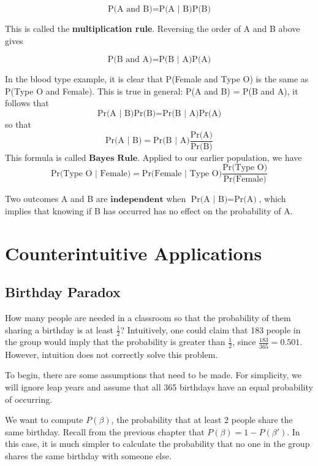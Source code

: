 \documentclass[
]{book}
\begin{document}
\[
\mbox{P(A and B)} = \mbox{P(A | B)}\mbox{P(B)}  
\]

This is called the \textbf{multiplication rule}. Reversing the order of A and B above gives

\[
\mbox{P(B and A)} = \mbox{P(B | A)}\mbox{P(A)}  
\]

In the blood type example, it is clear that P(Female and Type O) is the same as P(Type O and Female).
This is true in general: P(A and B) = P(B and A), it follows that
\[
\mbox{Pr(A | B)}\mbox{Pr(B)}  = \mbox{Pr(B | A)}\mbox{Pr(A)} 
\]
so that
\[
\mbox{Pr(A | B)}  = \mbox{Pr(B | A)}\frac{\mbox{Pr(A)}}{\mbox{Pr(B)}}
\]
This formula is called \(\textbf{Bayes Rule}\). Applied to our earlier population, we have
\[
\mbox{Pr(Type O | Female)} = \mbox{Pr(Female | Type O)}\frac{\mbox{Pr(Type O)}}{\mbox{Pr(Female)}}
\]

Two outcomes A and B are \(\textbf{independent}\) when \(\mbox{Pr(A | B)} = \mbox{Pr(A)}\),
which implies that knowing if B has occurred has no effect on the probability of A.

\hypertarget{counterintuitive-applications}{%
\chapter{Counterintuitive Applications}\label{counterintuitive-applications}}

\hypertarget{birthday-paradox}{%
\section{Birthday Paradox}\label{birthday-paradox}}

How many people are needed in a classroom so that the probability of them sharing a birthday is at least \(\frac{1}{2}\)?
Intuitively, one could claim that 183 people in the group would imply that the probability is greater than \(\frac{1}{2}\),
since \(\frac{183}{365} = 0.501\). However, intuition does not correctly solve this problem.

To begin, there are some assumptions that need to be made.
For simplicity, we will ignore leap years and assume that all 365 birthdays have an equal probability of occurring.

We want to compute \(P(\beta)\), the probability that at least 2 people share the same birthday.
Recall from the previous chapter that \(P(\beta) = 1 - P(\beta')\).
In this case, it is much simpler to calculate the probability that no one in the group shares the same birthday with someone else.
\end{document}
